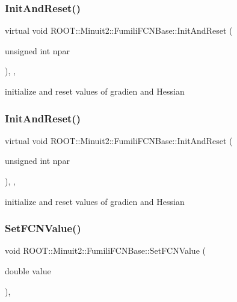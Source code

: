 \subsubsection{\texorpdfstring{InitAndReset()}{InitAndReset()}\hspace{0.1cm}{\footnotesize\ttfamily [1/2]}}
{\footnotesize\ttfamily virtual void R\+O\+O\+T\+::\+Minuit2\+::\+Fumili\+F\+C\+N\+Base\+::\+Init\+And\+Reset (\begin{DoxyParamCaption}\item[{unsigned int}]{npar }\end{DoxyParamCaption})\hspace{0.3cm}{\ttfamily [inline]}, {\ttfamily [protected]}, {\ttfamily [virtual]}}

initialize and reset values of gradien and Hessian \mbox{\label{classROOT_1_1Minuit2_1_1FumiliFCNBase_a523d4811858adf42922499fa6c2bcdba}} 
\subsubsection{\texorpdfstring{InitAndReset()}{InitAndReset()}\hspace{0.1cm}{\footnotesize\ttfamily [2/2]}}
{\footnotesize\ttfamily virtual void R\+O\+O\+T\+::\+Minuit2\+::\+Fumili\+F\+C\+N\+Base\+::\+Init\+And\+Reset (\begin{DoxyParamCaption}\item[{unsigned int}]{npar }\end{DoxyParamCaption})\hspace{0.3cm}{\ttfamily [inline]}, {\ttfamily [protected]}, {\ttfamily [virtual]}}

initialize and reset values of gradien and Hessian \mbox{\label{classROOT_1_1Minuit2_1_1FumiliFCNBase_a537ad24d5584bd089c14ee92567ddd72}} 
\subsubsection{\texorpdfstring{SetFCNValue()}{SetFCNValue()}\hspace{0.1cm}{\footnotesize\ttfamily [1/2]}}
{\footnotesize\ttfamily void R\+O\+O\+T\+::\+Minuit2\+::\+Fumili\+F\+C\+N\+Base\+::\+Set\+F\+C\+N\+Value (\begin{DoxyParamCaption}\item[{double}]{value }\end{DoxyParamCaption})\hspace{0.3cm}{\ttfamily [inline]}, {\ttfamily [protected]}}


